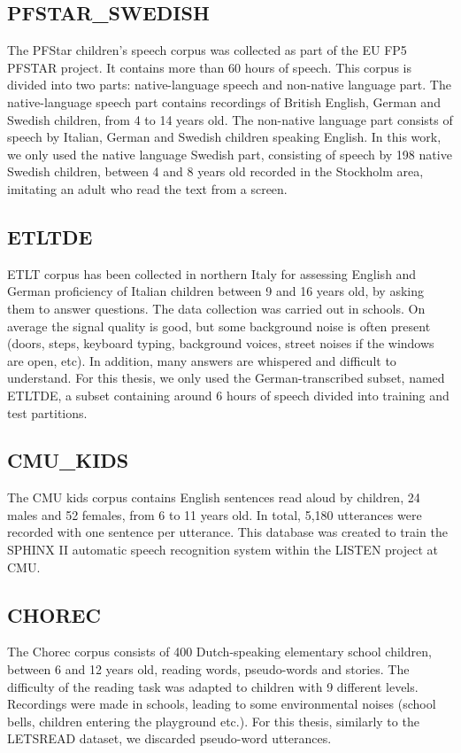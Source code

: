 \subsection{PFSTAR\_SWEDISH}
The PFStar children's speech corpus \cite{pfstar} was collected as part of the EU FP5 PFSTAR project. It contains more than 60 hours of speech. This corpus is divided into two parts: native-language speech and non-native language part.
The native-language speech part contains recordings of British English, German and Swedish children, from 4 to 14 years old. The non-native language part consists of speech by Italian, German and Swedish children speaking English. In this work, we only used the native language Swedish part, consisting of speech by 198 native Swedish children, between 4 and 8 years old recorded in the Stockholm area, imitating an adult who read the text from a screen.
\subsection{ETLTDE}
\ac{ETLT} corpus \cite{etlt} has been collected in northern Italy for assessing English and German proficiency of Italian children between 9 and 16 years old, by asking them to answer questions. The data collection was carried out in schools. On average the signal quality is good, but some background noise is often present (doors, steps, keyboard typing, background voices, street noises if the windows are open, etc). In addition, many answers are whispered and difficult to understand.
For this thesis, we only used the German-transcribed subset, named ETLTDE, a subset containing around 6 hours of speech divided into training and test partitions.
\subsection{CMU\_KIDS}
The \ac{CMU} kids corpus \cite{cmu} contains English sentences read aloud by children, 24 males and 52 females, from 6 to 11 years old. In total, 5,180 utterances were recorded with one sentence per utterance. This database was created to train the SPHINX II \cite{sphinx2} automatic speech recognition system within the LISTEN project at \ac{CMU}.
\subsection{CHOREC}
\label{subsection:chorec}
The Chorec corpus \cite{chorec} consists of 400 Dutch-speaking elementary school children, between 6 and 12 years old, reading words, pseudo-words and stories. The difficulty of the reading task was adapted to children with 9 different levels. Recordings were made in schools, leading to some environmental noises (school bells, children entering the playground etc.). For this thesis, similarly to the LETSREAD dataset, we discarded pseudo-word utterances.

